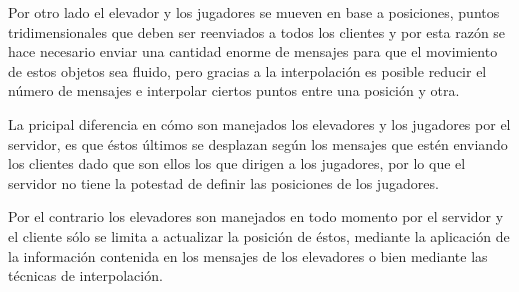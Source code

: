 \documentclass[a4paper,12pt,openany,oneside]{book}
\begin{document}
Por otro lado el elevador y los jugadores se mueven en base a posiciones, puntos tridimensionales que deben ser reenviados a todos los clientes y por esta razón se hace necesario enviar una cantidad enorme de mensajes para que el movimiento de estos objetos sea fluido, pero gracias a la interpolación es posible reducir el número de mensajes e interpolar ciertos puntos entre una posición y otra.

La pricipal diferencia en cómo son manejados los elevadores y los jugadores por el servidor, es que éstos últimos se desplazan según los mensajes que estén enviando los clientes dado que son ellos los que dirigen a los jugadores, por lo que el servidor no tiene la potestad de definir las posiciones de los jugadores. 

Por el contrario los elevadores son manejados en todo momento por el servidor y el cliente sólo se limita a actualizar la posición de éstos, mediante la aplicación de la información contenida en los mensajes de los elevadores o bien mediante las técnicas de interpolación.
\end{document}
